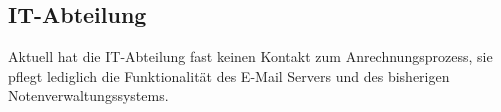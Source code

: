 \subsection{IT-Abteilung}

Aktuell hat die IT-Abteilung fast keinen Kontakt zum Anrechnungsprozess, sie pflegt lediglich die Funktionalität des E-Mail Servers und des bisherigen Notenverwaltungssystems.
